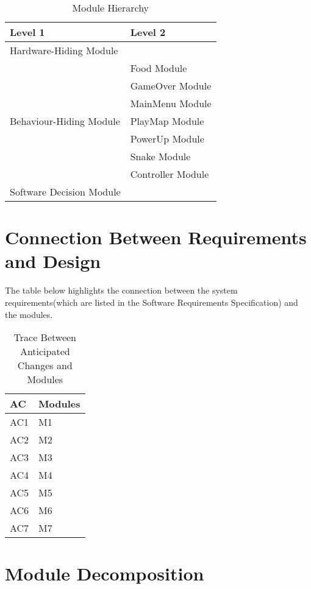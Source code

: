 \documentclass[12pt]{article}
\begin{document}
\begin{table}[h!]
\centering
\begin{tabular}{p{} p{}}
\toprule
\textbf{Level 1} & \textbf{Level 2}\\
\midrule

{Hardware-Hiding Module} & ~ \\
\midrule

\multirow{7}{0.3\textwidth}{Behaviour-Hiding Module} 
& Food Module\\
& GameOver Module\\
& MainMenu Module\\
& PlayMap Module\\
& PowerUp Module\\ 
& Snake Module\\
& Controller Module\\
\midrule

{Software Decision Module} & ~ \\
\bottomrule

\end{tabular}
\caption{Module Hierarchy}
\label{TblMH}
\end{table}

\section{Connection Between Requirements and Design} \label{SecConnection}

The table below highlights the connection between the system requirements(which are listed in the Software Requirements Specification) and the modules.

\begin{table}[H]
\centering
\begin{tabular}{p{} p{}}
\toprule
\textbf{AC} & \textbf{Modules}\\
\midrule
AC1 & M1\\
AC2 & M2\\
AC3 & M3\\
AC4 & M4\\
AC5 & M5\\
AC6 & M6\\
AC7 & M7\\
\bottomrule
\end{tabular}
\caption{Trace Between Anticipated Changes and Modules}
\end{table}

\section{Module Decomposition} \label{SecMD}
\end{document}
